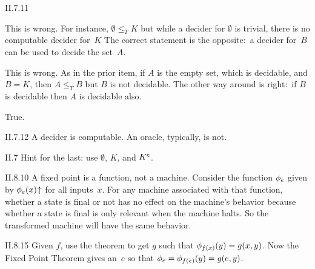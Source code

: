%
%
%
%
%
%
%
%
%
\begin{ans}{II.7.11}
\begin{exparts}
\item This is wrong.
For instance, $\emptyset\leq_T K$ but while a decider for
$\emptyset$ is trivial, there is no computable decider for~$K$
The correct statement is the opposite:~a decider for~$B$ can be used to decide
the set~$A$.
\item This is wrong.
As in the prior item, if $A$ is the empty set, which is decidable,
and $B=K$, then $A\leq_TB$ but $B$ is not decidable.
The other way around is right:~if $B$ is decidable then $A$ is decidable also.
\item True.
\end{exparts}
\end{ans}
%
\begin{ans}{II.7.12}
A decider is computable.
An oracle, typically, is not.
\end{ans}
%
%
%
%
%
%
\begin{ans}{II.7}
Hint for the last: use $\emptyset$, $K$, and ${K}^{\scriptstyle\textsf{c}}$.
\end{ans}
%
%
%
%
%
\begin{ans}{II.8.10}
A fixed point is a function, not a machine.
Consider the function $\phi_{e}$ given by $\TMfcn_{e}(x)\diverges$ for all
inputs~$x$.
For any machine associated with that function,
whether a state is final or not has no effect on the machine's behavior
because whether a state is final is only relevant when the machine halts.
So the transformed machine will have the same behavior.
\end{ans}
%
%
%
%
%
\begin{ans}{II.8.15}
Given $f$, use the \smn{} theorem to get $g$ such that
$\phi_{f(x)}(y)=g(x,y)$.
Now the Fixed Point Theorem gives an~$e$ so that
$\phi_e=\phi_{f(e)}(y)=g(e,y)$.
\end{ans}
